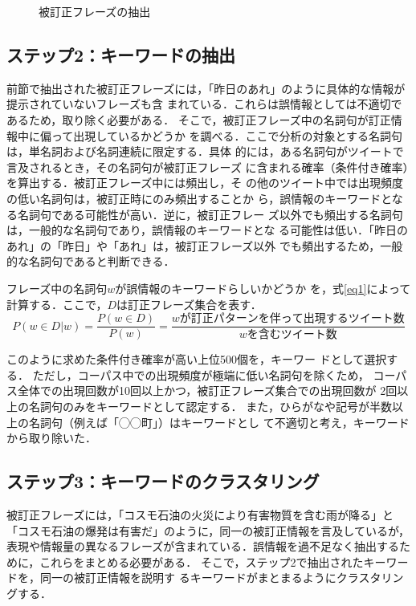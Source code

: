 \documentclass[japanese]{jnlp_1.4}
\begin{document}
\begin{figure}[t]
 \begin{center}

 \end{center}
 \caption{被訂正フレーズの抽出}
 \label{fig:correct_pattern_extraction}
\end{figure}


\subsection{ステップ2：キーワードの抽出}

前節で抽出された被訂正フレーズには，「昨日のあれ」のように具体的な情報が提示されていないフレーズも含
まれている．これらは誤情報としては不適切であるため，取り除く必要がある．
そこで，被訂正フレーズ中の名詞句が訂正情報中に偏って出現しているかどうか
を調べる．ここで分析の対象とする名詞句は，単名詞および名詞連続に限定する．具体
的には，ある名詞句がツイートで言及されるとき，その名詞句が被訂正フレーズ
に含まれる確率（条件付き確率）を算出する．被訂正フレーズ中には頻出し，そ
の他のツイート中では出現頻度の低い名詞句は，被訂正時にのみ頻出することか
ら，誤情報のキーワードとなる名詞句である可能性が高い．逆に，被訂正フレー
ズ以外でも頻出する名詞句は，一般的な名詞句であり，誤情報のキーワードとな
る可能性は低い．「昨日のあれ」の「昨日」や「あれ」は，被訂正フレーズ以外
でも頻出するため，一般的な名詞句であると判断できる．


フレーズ中の名詞句$w$が誤情報のキーワードらしいかどうか
を，式\ref{eq1}によって計算する．ここで，$D$は訂正フレーズ集合を表す．
\begin{equation}
 P(w \in D|w) = \frac{P(w \in D)}{P(w)} = \frac{wが訂正パターンを伴って
  出現するツイート数}{wを含むツイート数} \label{eq1}
\end{equation}

このように求めた条件付き確率が高い上位500個を，キーワー
ドとして選択する．
ただし，コーパス中での出現頻度が極端に低い名詞句を除くため，
コーパス全体での出現回数が10回以上かつ，被訂正フレーズ集合での出現回数が
2回以上の名詞句のみをキーワードとして認定する．
また，ひらがなや記号が半数以上の名詞句（例えば「◯◯町」）はキーワードとし
て不適切と考え，キーワードから取り除いた．


\subsection{ステップ3：キーワードのクラスタリング}

被訂正フレーズには，「コスモ石油の火災により有害物質を含む雨が降る」と
「コスモ石油の爆発は有害だ」のように，同一の被訂正情報を言及しているが，
表現や情報量の異なるフレーズが含まれている．誤情報を過不足なく抽出するた
めに，これらをまとめる必要がある．
そこで，ステップ2で抽出されたキーワードを，同一の被訂正情報を説明す
るキーワードがまとまるようにクラスタリングする．
\end{document}

